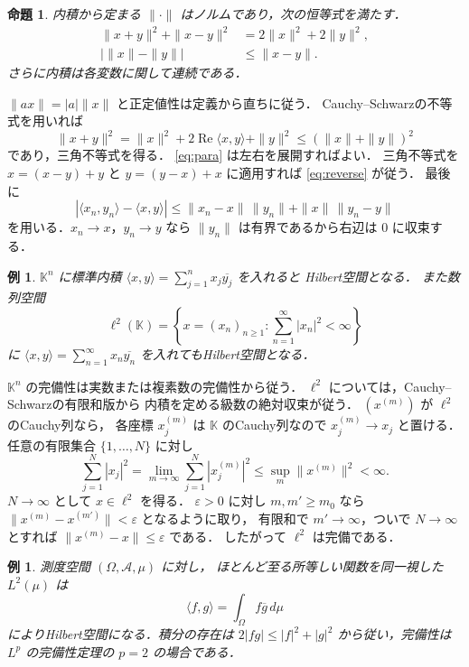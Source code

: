 \documentclass[a5paper,10pt,onecolumn]{jsarticle}
\makeatletter
\theoremstyle{mathnotetheorem}
\newtheorem{proposition}[theorem]{命題}
\newtheorem{example}[theorem]{例}
\renewcommand{\proofname}{証明}
\renewenvironment{proof}[1][\proofname]{%
  \par\pushQED{\qed}\normalfont\topsep4\p@\@plus2\p@\relax
  \trivlist\item[\hskip\labelsep\bfseries #1]\ignorespaces
}{\popQED\endtrivlist\@endpefalse}
\makeatother
\begin{document}
\begin{proposition}
内積から定まる $\|\cdot\|$ はノルムであり，次の恒等式を満たす．
\begin{align}
 \|x+y\|^2+\|x-y\|^2&=2\|x\|^2+2\|y\|^2,\label{eq:para}\\
 |\|x\|-\|y\||&\le\|x-y\|.\label{eq:reverse}
\end{align}
さらに内積は各変数に関して連続である．
\end{proposition}
\begin{proof}
$\|ax\|=|a|\|x\|$ と正定値性は定義から直ちに従う．
Cauchy--Schwarzの不等式を用いれば
\[
 \|x+y\|^2
 =\|x\|^2+2\operatorname{Re}\langle x,y\rangle+\|y\|^2
 \le(\|x\|+\|y\|)^2
\]
であり，三角不等式を得る．
\eqref{eq:para} は左右を展開すればよい．
三角不等式を $x=(x-y)+y$ と
$y=(y-x)+x$ に適用すれば \eqref{eq:reverse} が従う．
最後に
\[
 |\langle x_n,y_n\rangle-\langle x,y\rangle|
 \le\|x_n-x\|\,\|y_n\|+\|x\|\,\|y_n-y\|
\]
を用いる．$x_n\to x$，$y_n\to y$ なら
$\|y_n\|$ は有界であるから右辺は $0$ に収束する．
\end{proof}

\begin{example}
$\mathbb K^n$ に標準内積
$\langle x,y\rangle=\sum_{j=1}^n x_j\overline{y_j}$ を入れると
Hilbert空間となる．
また数列空間
\[
 \ell^2(\mathbb K)
 =\left\{x=(x_n)_{n\ge1}:\sum_{n=1}^\infty|x_n|^2<\infty\right\}
\]
に $\langle x,y\rangle=\sum_{n=1}^\infty x_n\overline{y_n}$
を入れてもHilbert空間となる．
\end{example}
\begin{proof}
$\mathbb K^n$ の完備性は実数または複素数の完備性から従う．
$\ell^2$ については，Cauchy--Schwarzの有限和版から
内積を定める級数の絶対収束が従う．
$(x^{(m)})$ が $\ell^2$ のCauchy列なら，
各座標 $x^{(m)}_j$ は $\mathbb K$ のCauchy列なので
$x^{(m)}_j\to x_j$ と置ける．
任意の有限集合 $\{1,\dots,N\}$ に対し
\[
 \sum_{j=1}^N|x_j|^2
 =\lim_{m\to\infty}\sum_{j=1}^N|x^{(m)}_j|^2
 \le \sup_m\|x^{(m)}\|^2<\infty.
\]
$N\to\infty$ として $x\in\ell^2$ を得る．
$\varepsilon>0$ に対し $m,m'\ge m_0$ なら
$\|x^{(m)}-x^{(m')}\|<\varepsilon$ となるように取り，
有限和で $m'\to\infty$，ついで $N\to\infty$ とすれば
$\|x^{(m)}-x\|\le\varepsilon$ である．
したがって $\ell^2$ は完備である．
\end{proof}

\begin{example}
測度空間 $(\Omega,\mathcal A,\mu)$ に対し，
ほとんど至る所等しい関数を同一視した $L^2(\mu)$ は
\[
 \langle f,g\rangle=\int_\Omega f\overline g\,d\mu
\]
によりHilbert空間になる．積分の存在は
$2|fg|\le|f|^2+|g|^2$ から従い，完備性は
$L^p$ の完備性定理の $p=2$ の場合である．
\end{example}
\end{document}
